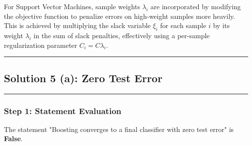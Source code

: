 \documentclass{article}
\begin{document}
\subsubsection*{}
\parbox{\textwidth}{
For Support Vector Machines, sample weights $\lambda_i$ are incorporated by modifying the objective function to penalize errors on high-weight samples more heavily. This is achieved by multiplying the slack variable $\xi_i$ for each sample $i$ by its weight $\lambda_i$ in the sum of slack penalties, effectively using a per-sample regularization parameter $C_i = C \lambda_i$.
}

\noindent\rule{\textwidth}{0.4pt}

\newpage

\subsection*{Solution 5 (a): Zero Test Error}
\noindent\rule{\textwidth}{0.4pt}

\subsubsection*{Step 1: Statement Evaluation}
\parbox{\textwidth}{
The statement "Boosting converges to a final classifier with zero test error" is \textbf{False}.
}
\end{document}
